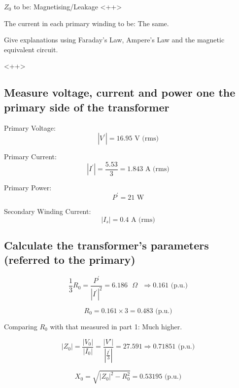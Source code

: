 \documentclass{article}
\begin{document}
$Z_0$ to be: Magnetising/Leakage <++>

The current in each primary winding to be: The same.

Give explanations using Faraday's Law, Ampere's Law and the magnetic equivalent circuit.

<++>

\subsection{Measure voltage, current and power one the primary side of the transformer} 

Primary Voltage:
\begin{equation}
  | V^{'} | = 16.95 \text{ V (rms)}
\end{equation}

Primary Current:
\begin{equation}
  | I^{'} | = \frac{5.53}{3} = 1.843 \text{ A (rms)}
\end{equation}

Primary Power:
\begin{equation}
  P^{'} = 21 \text{ W}
\end{equation}

Secondary Winding Current:
\begin{equation}
  | I_{s} | = 0.4 \text{ A (rms)}
\end{equation}

\subsection{Calculate the transformer's parameters (referred to the primary)} 

\begin{equation}
  \frac{1}{3} R_0 = \frac{P^{'}}{|I^{'} |^{2}} = 6.186 \text{ $\Omega$ } \Rightarrow 0.161  \text{ (p.u.)}
\end{equation}

\begin{equation}
  R_0  = 0.161 \times 3 = 0.483 \text{ (p.u.)}
\end{equation}

Comparing $R_0$ with that measured in part 1: Much higher. 

\begin{equation}
  | Z_0 | = \frac{| V_0 |}{| I_0 |} = \frac{| V' |}{| \frac{I^{'}}{3}|} = 27.591 \Rightarrow 0.71851 \text{ (p.u.)}
\end{equation}

\begin{equation}
  X_0 = \sqrt{| Z_0 |^{2} - R^{2}_0} = 0.53195 \text{ (p.u.)}
\end{equation}
\end{document}
